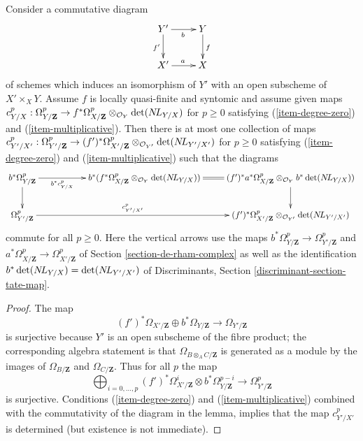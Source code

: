 \begin{lemma}
\label{lemma-base-change-Garel-upstairs}
Consider a commutative diagram
$$
\xymatrix{
Y' \ar[d]_{f'} \ar[r]_b & Y \ar[d]^f \\
X' \ar[r]^a & X
}
$$
of schemes which induces an isomorphism of $Y'$ with an open subscheme of
$X' \times_X Y$. Assume $f$ is locally quasi-finite and syntomic and
assume given maps $c^p_{Y/X} : \Omega^p_{Y/\mathbf{Z}} \to
f^*\Omega^p_{X/\mathbf{Z}} \otimes_{\mathcal{O}_Y} \det(\mathop{N\!L}\nolimits_{Y/X})$
for $p \geq 0$ satisfying
(\ref{item-degree-zero}) and (\ref{item-multiplicative}).
Then there is at most one collection of maps
$c^p_{Y'/X'} : \Omega^p_{Y'/\mathbf{Z}} \to
(f')^*\Omega^p_{X'/\mathbf{Z}} \otimes_{\mathcal{O}_{Y'}} \det(\mathop{N\!L}\nolimits_{Y'/X'})$
for $p \geq 0$
satisfying (\ref{item-degree-zero}) and (\ref{item-multiplicative})
such that the diagrams
$$
\xymatrix{
b^*\Omega^p_{Y/\mathbf{Z}} \ar[rr]_-{b^*c^p_{Y/X}} \ar[d] & &
b^*(f^*\Omega^p_{X/\mathbf{Z}} \otimes_{\mathcal{O}_Y} \det(\NL_{Y/X}))
\ar@{=}[r] &
(f')^*a^*\Omega^p_{X/\mathbf{Z}} \otimes_{\mathcal{O}_Y} b^*\det(\NL_{Y/X}))
\ar[d] \\
\Omega^p_{Y'/\mathbf{Z}} \ar[rrr]^-{c^p_{Y'/X'}} & & &
(f')^*\Omega^p_{X'/\mathbf{Z}} \otimes_{\mathcal{O}_{Y'}} \det(\NL_{Y'/X'})
}
$$
commute for all $p \geq 0$. Here the vertical arrows use the maps
$b^*\Omega^p_{Y/\mathbf{Z}} \to \Omega^p_{Y'/\mathbf{Z}}$ and
$a^*\Omega^p_{X/\mathbf{Z}} \to \Omega^p_{X'/\mathbf{Z}}$
of Section \ref{section-de-rham-complex}
as well as the identification $b^*\det(\mathop{N\!L}\nolimits_{Y/X}) = \det(\mathop{N\!L}\nolimits_{Y'/X'})$ of
Discriminants, Section \ref{discriminant-section-tate-map}.
\end{lemma}

\begin{proof}
The map
$$
(f')^*\Omega_{X'/\mathbf{Z}} \oplus b^*\Omega_{Y/\mathbf{Z}}
\longrightarrow
\Omega_{Y'/\mathbf{Z}}
$$
is surjective because $Y'$ is an open subscheme of the fibre product;
the corresponding algebra statement is that $\Omega_{B \otimes_A C/\mathbf{Z}}$
is generated as a module by the images of $\Omega_{B/\mathbf{Z}}$ and
$\Omega_{C/\mathbf{Z}}$. Thus for all $p$ the map
$$
\bigoplus\nolimits_{i = 0, \ldots, p}
(f')^*\Omega^i_{X'/\mathbf{Z}} \otimes
b^*\Omega^{p - i}_{Y/\mathbf{Z}}
\longrightarrow
\Omega^p_{Y'/\mathbf{Z}}
$$
is surjective. Conditions (\ref{item-degree-zero}) and
(\ref{item-multiplicative}) combined with the commutativity
of the diagram in the lemma, implies that the map $c^p_{Y'/X'}$
is determined (but existence is not immediate).
\end{proof}


